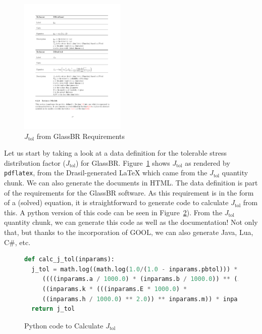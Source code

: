 \documentclass[sigconf]{acmart}
\newcommand{\jtol}{$J_{\mbox{tol}}$}
\begin{document}
\begin{figure}
\begin{center}
\includegraphics[width=0.45\textwidth]{./figures/Jtol_pdf.pdf}
\end{center}
\caption{\jtol{} from GlassBR Requirements}
\label{Fig_Jtolpdf}
\end{figure}

Let us start by taking a look at a data definition for the tolerable stress
distribution factor (\jtol{}) for GlassBR. Figure~\ref{Fig_Jtolpdf} shows
\jtol{} as rendered by \texttt{pdflatex}, from the Drasil-generated LaTeX 
which came from the \jtol{} quantity chunk. We can also generate the documents
in HTML. The data definition is part of the requirements for the GlassBR
software.  As this requirement is in the form of a (solved) equation, it is
straightforward to generate code to
calculate \jtol{} from this.  A python version of this code can be seen in
Figure~\ref{Fig_JtolPython}). From the \jtol{} quantity chunk, we can generate
this code as well as the documentation!  Not only that, but thanks to the
incorporation of GOOL, we can also generate Java, Lua, C\#, etc.

 \begin{figure}
 \begin{lstlisting}[language=python, frame=single, showstringspaces=false, basicstyle=\small]
def calc_j_tol(inparams):
  j_tol = math.log((math.log(1.0/(1.0 - inparams.pbtol))) * 
     ((((inparams.a / 1000.0) * (inparams.b / 1000.0)) ** (inparams.m - 1.0)) / 
     ((inparams.k * (((inparams.E * 1000.0) * 
     ((inparams.h / 1000.0) ** 2.0)) ** inparams.m)) * inparams.ldf))) 
  return j_tol
 \end{lstlisting}
 \caption{Python code to Calculate \jtol{}}
 \label{Fig_JtolPython}
 \end{figure}
\end{document}
